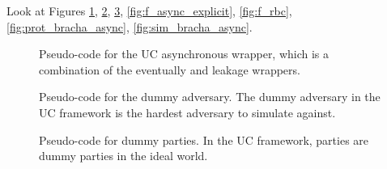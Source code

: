 %


Look at Figures \ref{fig:wrapper_async_new}, \ref{fig:dummy_adversary}, \ref{fig:dummy_party}, \ref{fig:f_async_explicit}, \ref{fig:f_rbc}, \ref{fig:prot_bracha_async}, \ref{fig:sim_bracha_async}.

\begin{figure}[!hbt]
\centering
	
	\caption{Pseudo-code for the UC asynchronous wrapper, which is a combination of the eventually and leakage wrappers.}
	\label{fig:wrapper_async_new}
\end{figure}

\begin{figure}[!hbt]
\centering
	
	\caption{Pseudo-code for the dummy adversary. The dummy adversary in the UC framework is the hardest adversary to simulate against.}
	\label{fig:dummy_adversary}
\end{figure}

\begin{figure}[!hbt]
\centering
	
	\caption{Pseudo-code for dummy parties. In the UC framework, parties are dummy parties in the ideal world.}
	\label{fig:dummy_party}
\end{figure}

